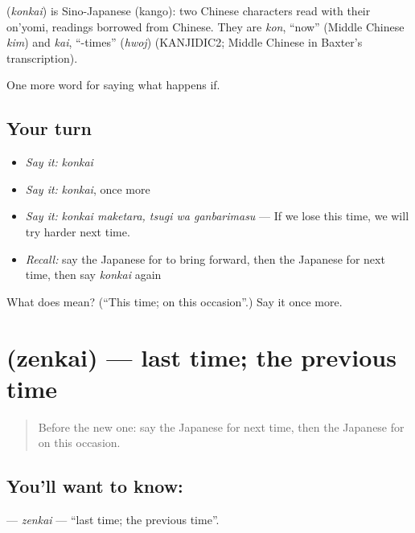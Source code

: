 \begin{cousinweb}
\textbf{} (\emph{konkai}) is Sino-Japanese (kango): two Chinese characters read with their on'yomi, readings borrowed from Chinese. They are \emph{kon}, \textquotedblleft{}now\textquotedblright{} (Middle Chinese \emph{kim}) and \emph{kai}, \textquotedblleft{}-times\textquotedblright{} (\emph{hwoj}) (KANJIDIC2; Middle Chinese in Baxter's transcription).
\end{cousinweb}

\begin{grammarlens}[title={What you've built}]
One more word for saying what happens if.
\end{grammarlens}

\subsection*{Your turn}
\begin{itemize}
\raggedright
  \item \emph{Say it:} \emph{konkai}
  \item \emph{Say it:} \emph{konkai}, once more
  \item \emph{Say it:} \emph{konkai maketara, tsugi wa ganbarimasu} — If we lose this time, we will try harder next time.
  \item \emph{Recall:} say the Japanese for to bring forward, then the Japanese for next time, then say \emph{konkai} again
\end{itemize}

\begin{tcolorbox}[breakable,colback=teal!4,colframe=teal!35!black,title={Before you move on}]
What does  mean? (\textquotedblleft{}This time; on this occasion\textquotedblright{}.) Say it once more.
\end{tcolorbox}
\section[\texorpdfstring{\ja{ぜんかい} (zenkai)}{ぜんかい (zenkai)}]{ (zenkai) — last time; the previous time}

\label{lesson:JA-C346-zenkai}



\begin{quote}
Before the new one: say the Japanese for next time, then the Japanese for on this occasion.
\end{quote}

\subsection*{You'll want to know: }
\textbf{} — \emph{zenkai} — \textquotedblleft{}last time; the previous time\textquotedblright{}.

